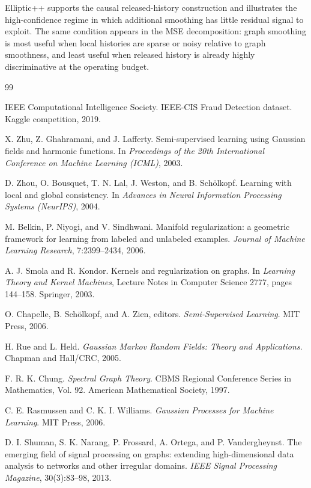 \documentclass[11pt]{article}
\theoremstyle{definition}
\theoremstyle{remark}
\begin{document}
Elliptic++ supports the causal released-history construction and illustrates the high-confidence regime in which additional smoothing has little residual signal to exploit. The same condition appears in the MSE decomposition: graph smoothing is most useful when local histories are sparse or noisy relative to graph smoothness, and least useful when released history is already highly discriminative at the operating budget.

\begin{thebibliography}{99}

IEEE Computational Intelligence Society.
IEEE-CIS Fraud Detection dataset. Kaggle competition, 2019.

X. Zhu, Z. Ghahramani, and J. Lafferty.
Semi-supervised learning using Gaussian fields and harmonic functions.
In \emph{Proceedings of the 20th International Conference on Machine Learning (ICML)}, 2003.

D. Zhou, O. Bousquet, T. N. Lal, J. Weston, and B. Schölkopf.
Learning with local and global consistency.
In \emph{Advances in Neural Information Processing Systems (NeurIPS)}, 2004.

M. Belkin, P. Niyogi, and V. Sindhwani.
Manifold regularization: a geometric framework for learning from labeled and unlabeled examples.
\emph{Journal of Machine Learning Research}, 7:2399--2434, 2006.

A. J. Smola and R. Kondor.
Kernels and regularization on graphs.
In \emph{Learning Theory and Kernel Machines}, Lecture Notes in Computer Science 2777, pages 144--158. Springer, 2003.

O. Chapelle, B. Schölkopf, and A. Zien, editors.
\emph{Semi-Supervised Learning}.
MIT Press, 2006.

H. Rue and L. Held.
\emph{Gaussian Markov Random Fields: Theory and Applications}.
Chapman and Hall/CRC, 2005.

F. R. K. Chung.
\emph{Spectral Graph Theory}.
CBMS Regional Conference Series in Mathematics, Vol. 92. American Mathematical Society, 1997.

C. E. Rasmussen and C. K. I. Williams.
\emph{Gaussian Processes for Machine Learning}.
MIT Press, 2006.

D. I. Shuman, S. K. Narang, P. Frossard, A. Ortega, and P. Vandergheynst.
The emerging field of signal processing on graphs: extending high-dimensional data analysis to networks and other irregular domains.
\emph{IEEE Signal Processing Magazine}, 30(3):83--98, 2013.


\end{thebibliography}
\end{document}
